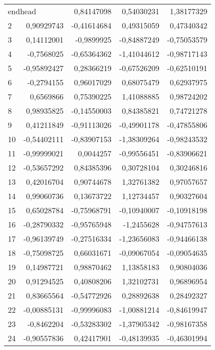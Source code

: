 \documentclass[12pt]{article}
\begin{document}
\begin{longtable}{lrrrr}
\multicolumn{2}{l}{endhead}\endhead
\multicolumn{5}{c}{endfoot} \endfoot
\multicolumn{2}{l}{Erster Tabellenkopf} \endfirsthead
\multicolumn{5}{c}{Ende der Tabelle}\endlastfoot
  1 & 0,84147098 & 0,54030231 & 1,38177329 & 0,98218827 \\
  2 & 0,90929743 & -0,41614684 & 0,49315059 & 0,47340342 \\
  3 & 0,14112001 & -0,9899925 & -0,84887249 & -0,75053579 \\
  4 & -0,7568025 & -0,65364362 & -1,41044612 & -0,98717143 \\
  5 & -0,95892427 & 0,28366219 & -0,67526209 & -0,62510191 \\
  6 & -0,2794155 & 0,96017029 & 0,68075479 & 0,62937975 \\
  7 &  0,6569866 & 0,75390225 & 1,41088885 & 0,98724202 \\
  8 & 0,98935825 & -0,14550003 & 0,84385821 & 0,74721278 \\
  9 & 0,41211849 & -0,91113026 & -0,49901178 & -0,47855806 \\
 10 & -0,54402111 & -0,83907153 & -1,38309264 & -0,98243532 \\
 11 & -0,99999021 &  0,0044257 & -0,99556451 & -0,83906621 \\
 12 & -0,53657292 & 0,84385396 & 0,30728104 & 0,30246816 \\
 13 & 0,42016704 & 0,90744678 & 1,32761382 & 0,97057657 \\
 14 & 0,99060736 & 0,13673722 & 1,12734457 & 0,90327604 \\
 15 & 0,65028784 & -0,75968791 & -0,10940007 & -0,10918198 \\
 16 & -0,28790332 & -0,95765948 & -1,2455628 & -0,94757613 \\
 17 & -0,96139749 & -0,27516334 & -1,23656083 & -0,94466138 \\
 18 & -0,75098725 & 0,66031671 & -0,09067054 & -0,09054635 \\
 19 & 0,14987721 & 0,98870462 & 1,13858183 & 0,90804036 \\
 20 & 0,91294525 & 0,40808206 & 1,32102731 & 0,96896954 \\
 21 & 0,83665564 & -0,54772926 & 0,28892638 & 0,28492327 \\
 22 & -0,00885131 & -0,99996083 & -1,00881214 & -0,84619947 \\
 23 & -0,8462204 & -0,53283302 & -1,37905342 & -0,98167358 \\
 24 & -0,90557836 & 0,42417901 & -0,48139935 & -0,46301994 \\

\end{longtable}
\end{document}
